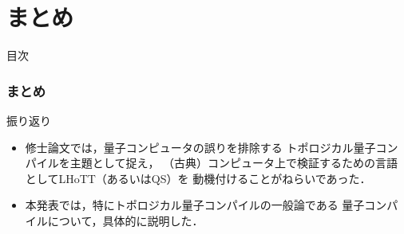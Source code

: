 \documentclass{beamer} %
\newcommand{\0}{\mathbf{0}}
\newcommand{\1}{\mathbf{1}}
\newcommand{\2}{\mathbf{2}}
\begin{document}
\section{まとめ}
\begin{frame}[noframenumbering]{目次}
  \tableofcontents[currentsection]
\end{frame}

\begin{frame}
  \frametitle{まとめ}
  \begin{block}{振り返り}
    \begin{itemize}
      \item 修士論文では，量子コンピュータの誤りを排除する
            トポロジカル量子コンパイルを主題として捉え，
            （古典）コンピュータ上で検証するための言語としてLHoTT（あるいはQS）を
            動機付けることがねらいであった．
      \item 本発表では，特にトポロジカル量子コンパイルの一般論である
            量子コンパイルについて，具体的に説明した．
    \end{itemize}
  \end{block}
\end{frame}

\end{document}
